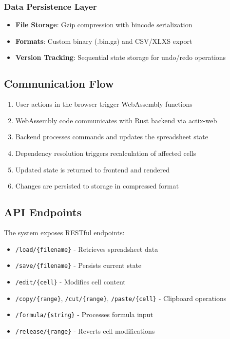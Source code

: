\documentclass[10pt,a4paper]{article}  %
\begin{document}
\subsubsection{Data Persistence Layer}
\begin{itemize}
    \item \textbf{File Storage}: Gzip compression with bincode serialization
    \item \textbf{Formats}: Custom binary (.bin.gz) and CSV/XLXS export
    \item \textbf{Version Tracking}: Sequential state storage for undo/redo operations
\end{itemize}

\subsection{Communication Flow}

\begin{enumerate}
    \item User actions in the browser trigger WebAssembly functions
    \item WebAssembly code communicates with Rust backend via actix-web
    \item Backend processes commands and updates the spreadsheet state
    \item Dependency resolution triggers recalculation of affected cells
    \item Updated state is returned to frontend and rendered
    \item Changes are persisted to storage in compressed format
\end{enumerate}

\subsection{API Endpoints}

The system exposes RESTful endpoints:
\begin{itemize}
    \item \texttt{/load/\{filename\}} - Retrieves spreadsheet data
    \item \texttt{/save/\{filename\}} - Persists current state
    \item \texttt{/edit/\{cell\}} - Modifies cell content
    \item \texttt{/copy/\{range\}}, \texttt{/cut/\{range\}}, \texttt{/paste/\{cell\}} - Clipboard operations
    \item \texttt{/formula/\{string\}} - Processes formula input
    \item \texttt{/release/\{range\}} - Reverts cell modifications
\end{itemize}
\end{document}
